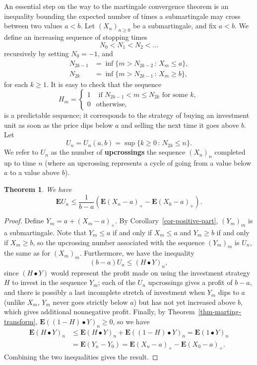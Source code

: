 \documentclass[12pt]{article}
\newtheorem{thm}{Theorem}[section]
\newcommand{\expec}{\mathbf{E}}
\theoremstyle{example}
\begin{document}
An essential step on the way to the martingale convergence theorem is an inequality bounding the expected number of times a submartingale may cross between two values $a<b$. Let $(X_n)_{n\ge 0}$ be a submartingale, and fix $a<b$. We define an increasing sequence of stopping times
$$ N_0 < N_1 < N_2 < \ldots $$
recursively by setting $N_0=-1$, and
\begin{align*}
N_{2k-1} &= \inf \{ m > N_{2k-2}\,:\,X_m\le a\}, \\
N_{2k} &= \inf \{ m > N_{2k-1}\,:\,X_m\ge b\},
\end{align*}
for each $k\ge 1$. It is easy to check that the sequence
$$ H_m = \begin{cases} 1 &\textrm{ if }N_{2k-1}<m\le N_{2k}\textrm{ for some }k, \\
0 & \textrm{otherwise},
\end{cases}
$$
is a predictable sequence; it corresponds to the strategy of buying an investment unit as soon as the price dips below $a$ and selling the next time it goes above $b$. Let
$$ U_n = U_n(a,b) = \sup \{ k\ge 0\,:\,N_{2k}\le n\}. $$
We refer to $U_n$ as the number of \textbf{upcrossings} the sequence $(X_n)_n$ completed up to time $n$ (where an upcrossing represents a cycle of going from a value below $a$ to a value above $b$).

\begin{thm} We have
$$ \expec U_n \le \frac{1}{b-a}\left( \expec(X_n-a)_+ - \expec(X_0-a)_+ \right). $$
\end{thm}

\begin{proof}
Define $Y_m = a+(X_m-a)_+$. By Corollary~\ref{cor-positive-part}, $(Y_m)_m$ is a submartingale.
Note that $Y_m\le a$ if and only if $X_m\le a$ and $Y_m\ge b$ if and only if $X_m\ge b$, so the upcrossing number associated with the sequence $(Y_m)_m$ is $U_n$, the same as for $(X_m)_m$. Furthermore, we have the inequality
$$ (b-a)U_n \le (H\bullet Y)_n, $$
since $(H\bullet Y)$ would represent the profit made on using the investment strategy $H$ to invest in the sequence $Y_m$; each of the $U_n$ upcrossings gives a profit of $b-a$, and there is possibly a last incomplete stretch of investment when $Y_m$ dips to $a$ (unlike $X_m$, $Y_m$ never goes strictly below $a$) but has not yet increased above $b$, which gives additional nonnegative profit. Finally, by Theorem~\ref{thm-marting-transform}, $\expec((1-H)\bullet Y)_n\ge 0$, so we have
\begin{align*}
\expec(H\bullet Y)_n &\le \expec(H\bullet Y)_n + \expec((1-H)\bullet Y)_n = \expec(1\bullet Y)_n \\ &= \expec(Y_n-Y_0) = \expec(X_n-a)_+ - \expec(X_0-a)_+.
\end{align*}
Combining the two inequalities gives the result.
\end{proof}
\end{document}
